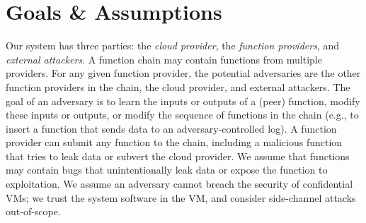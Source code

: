 \section{Goals \& Assumptions}
\label{sec:motivation}

%
Our \SystemName system has three parties: the \emph{cloud provider}, the
\emph{function providers}, and \emph{external attackers}.
%
A function chain may contain functions from multiple providers.
%
For any given function provider, the potential adversaries
are the other function providers in the chain, the cloud provider, and
external attackers.
%
The goal of an adversary is to learn the inputs or outputs of a (peer)
function, modify these inputs or outputs, or modify the sequence of functions
in the chain (e.g., to insert a function that sends data to an
adversary-controlled log).
%
A function provider can submit any function to the chain, including a
malicious function that tries to leak data or subvert the cloud
provider.
%
We assume that functions may contain bugs that unintentionally leak
data or expose the function to exploitation.
%
We assume an adversary cannot breach the security of confidential VMs; we trust
the system software in the VM, and consider side-channel attacks out-of-scope.
%


